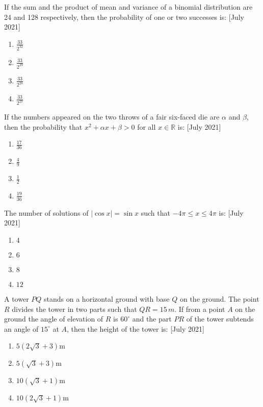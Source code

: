 \iffalse
\title{2021}
\author{AI24BTECH11012}
\section{mcq-single}
\fi
    \item If the sum and the product of mean and variance of a binomial distribution are 24 and 128 respectively, then the probability of one or two successes is:
    \hfill{[July 2021]}
    \begin{enumerate}
        \item $\frac{33}{2^{32}}$
        \item $\frac{33}{2^{29}}$
        \item $\frac{33}{2^{28}}$
        \item $\frac{33}{2^{27}}$
    \end{enumerate}
    
    \item If the numbers appeared on the two throws of a fair six-faced die are $\alpha$ and $\beta$, then the probability that $x^2 + \alpha x + \beta > 0$ for all $x \in \mathbb{R}$ is:
    \hfill{[July 2021]}
    \begin{enumerate}
        \item $\frac{17}{36}$
        \item $\frac{4}{9}$
        \item $\frac{1}{2}$
        \item $\frac{19}{36}$
    \end{enumerate}

    \item The number of solutions of $|\cos x| = \sin x$ such that $-4\pi \leq x \leq 4\pi$ is:
    \hfill{[July 2021]}
    \begin{enumerate}
        \item $4$
        \item $6$
        \item $8$
        \item $12$
    \end{enumerate}

    \item A tower $PQ$ stands on a horizontal ground with base $Q$ on the ground. The point $R$ divides the tower in two parts such that $QR = 15 \, m$. If from a point $A$ on the ground the angle of elevation of $R$ is $60^\circ$ and the part $PR$ of the tower subtends an angle of $15^\circ$ at $A$, then the height of the tower is:
    \hfill{[July 2021]}
    \begin{enumerate}
        \item $5(2\sqrt{3} + 3)$m
        \item $5(\sqrt{3} + 3)$m
        \item $10(\sqrt{3} + 1)$m
        \item $10(2\sqrt{3} + 1)$m
    \end{enumerate}

